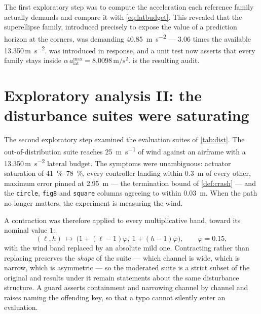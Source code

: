 \documentclass[11pt,a4paper,twoside,openright]{report}
\newcommand{\vAlat}{13.350}              %
\newcommand{\vAlatCap}{8.0098}           %
\theoremstyle{plain}
\theoremstyle{definition}
\theoremstyle{remark}
\begin{document}
	The first exploratory step was to compute the acceleration each reference
	family actually demands and compare it with \cref{eq:latbudget}. This revealed
	that the superellipse family, introduced precisely to expose the value of a
	prediction horizon at the corners, was demanding
	\SI{40.85}{\metre\per\square\second} --- \num{3.06} times the available
	\vAlat\,\si{\metre\per\square\second}.  was introduced in
	response, and a unit test now asserts that every family stays inside
	$\alpha\,a_\mathrm{lat}^{\max}=\vAlatCap\,\si{\metre\per\square\second}$.
	 is the resulting audit.

	\section{Exploratory analysis II: the disturbance suites were saturating}
	\label{sec:moderation}

	The second exploratory step examined the evaluation suites of
	\cref{tab:dist}. The out-of-distribution suite reaches
	\SI{25}{\metre\per\second} of wind against an airframe with a
	\vAlat\,\si{\metre\per\square\second} lateral budget. The symptoms were
	unambiguous: actuator saturation of \SIrange{41}{78}{\percent}, every controller
	landing within \SI{0.3}{\metre} of every other, maximum error pinned at
	\SI{2.95}{\metre} --- the termination bound of \cref{def:crash} --- and the
	\texttt{circle}, \texttt{fig8} and \texttt{square} columns agreeing to within
	\SI{0.03}{\metre}. When the path no longer matters, the experiment is measuring
	the wind.

	A contraction was therefore applied to every multiplicative band, toward its
	nominal value $1$:
	\begin{equation}
		(\ell,h)\ \longmapsto\ \big(1+(\ell-1)\varphi,\ 1+(h-1)\varphi\big),
		\qquad \varphi=0.15,
		\label{eq:moderate}
	\end{equation}
	with the wind band replaced by an absolute mild one. Contracting rather than
	replacing preserves the \emph{shape} of the suite --- which channel is wide,
	which is narrow, which is asymmetric --- so the moderated suite is a strict
	subset of the original and results under it remain statements about the same
	disturbance structure. A guard asserts containment and narrowing channel by
	channel and raises naming the offending key, so that a typo cannot silently
	enter an evaluation.
\end{document}
